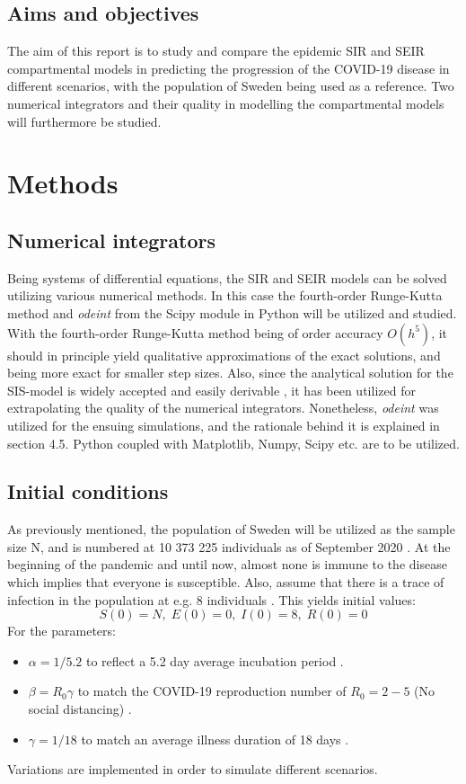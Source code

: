 \documentclass[12pt]{article}
\begin{document}
\subsection{Aims and objectives}
The aim of this report is to study and compare the epidemic SIR 
and SEIR compartmental models in predicting the progression of 
the COVID-19 disease in different scenarios, with the population 
of Sweden being used as a reference. Two numerical integrators 
and their quality in modelling the compartmental models 
will furthermore be studied.

\newpage 
\section{Methods}
\subsection{Numerical integrators}
Being systems of differential equations, the SIR and SEIR models 
can be solved utilizing various numerical methods. In this case 
the fourth-order Runge-Kutta method and \textit{odeint} from the 
Scipy module in Python will be utilized and studied. 
With the fourth-order Runge-Kutta method being of order accuracy $O(h^5)$, 
it should in principle yield qualitative approximations of the exact solutions, 
and being more exact for smaller step sizes. Also, since the analytical solution 
for the SIS-model is widely accepted and easily derivable \cite{söder}, 
it has been utilized for extrapolating the quality of the numerical integrators. 
Nonetheless, \textit{odeint} was utilized for the ensuing simulations, 
and the rationale behind it is explained in section 4.5. 
Python coupled with Matplotlib, Numpy, Scipy etc. are to be utilized.
\subsection{Initial conditions}
As previously mentioned, the population of Sweden will be utilized as 
the sample size N, and is numbered at 10 373 225
individuals as of September 2020 \cite{Scb}. At the beginning of the pandemic 
and until now, almost none is immune to the disease which implies 
that everyone is susceptible. Also, assume that there is a trace 
of infection in the population at e.g. 8 individuals \cite{smith_moore}. 
This yields initial values: 
\begin{equation}
S(0) = N, \; E(0) = 0, \; I(0) = 8, \; R(0) = 0
\end{equation}
For the parameters:
\begin{itemize}
  \item $\alpha = 1/5.2$ to reflect a 5.2 day 
  average incubation period \cite{atkeson}.
  \item $\beta = R_0 \gamma$ to match the COVID-19 
  reproduction number of $R_0 = 2-5$ \newline (No social distancing) \cite{sanche}. 
  \item $\gamma = 1/18$ to match an average illness duration of 18 days \cite{atkeson}.
\end{itemize}
Variations are implemented in order to simulate different scenarios.
\newpage 
\end{document}
